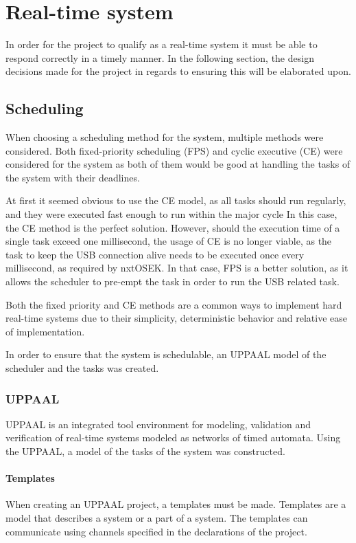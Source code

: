 \section{Real-time system}\label{Design:RTS} 
In order for the project to qualify as a real-time system it must be able to respond correctly in a timely manner.
In the following section, the design decisions made for the project in regards to ensuring this will be elaborated upon. 

\subsection{Scheduling}\label{Design:Scheduling}
When choosing a scheduling method for the system, multiple methods were considered. 
Both fixed-priority scheduling (FPS) and cyclic executive (CE) were considered for the system as both of them would be good at handling the tasks of the system with their deadlines.

At first it seemed obvious to use the CE model, as all tasks should run regularly, and they were executed fast enough to run within the major cycle
In this case, the CE method is the perfect solution. 
However, should the execution time of a single task exceed one millisecond, the usage of CE is no longer viable, as the task to keep the USB connection alive needs to be executed once every millisecond, as required by nxtOSEK.
In that case, FPS is a better solution, as it allows the scheduler to pre-empt the task in order to run the USB related task.

Both the fixed priority and CE methods are a common ways to implement hard real-time systems due to their simplicity, deterministic behavior and relative ease of implementation\cite{CyclicExecutionKimLarsen}.

In order to ensure that the system is schedulable, an UPPAAL model of the scheduler and the tasks was created. 

\subsubsection{UPPAAL}
UPPAAL is an integrated tool environment for modeling, validation and verification of real-time systems modeled as networks of timed automata\cite{UPPAALWebsite}. 
Using the UPPAAL, a model of the tasks of the system was constructed. 

\paragraph{Templates}
When creating an UPPAAL project, a templates must be made.
Templates are a model that describes a system or a part of a system.  
The templates can communicate using channels specified in the declarations of the project.

